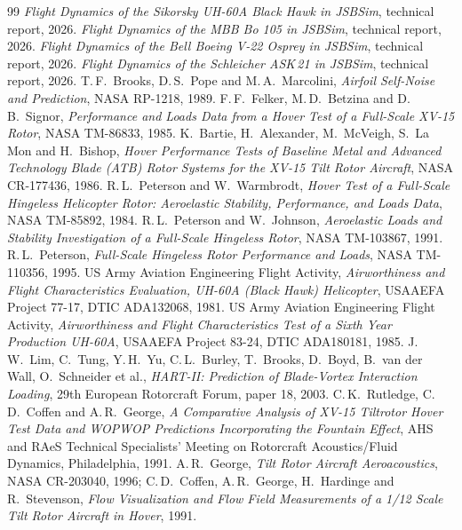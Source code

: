 \documentclass[10pt,a4paper,twocolumn]{article}
\begin{document}
\begin{thebibliography}{99}\small
{} \emph{Flight Dynamics of the Sikorsky UH-60A Black Hawk in JSBSim}, technical report, 2026.
 \emph{Flight Dynamics of the MBB Bo 105 in JSBSim}, technical report, 2026.
 \emph{Flight Dynamics of the Bell Boeing V-22 Osprey in JSBSim}, technical report, 2026.
 \emph{Flight Dynamics of the Schleicher ASK\,21 in JSBSim}, technical report, 2026.
 T.\,F.\ Brooks, D.\,S.\ Pope and M.\,A.\ Marcolini, \emph{Airfoil Self-Noise and Prediction}, NASA RP-1218, 1989.
 F.\,F.\ Felker, M.\,D.\ Betzina and D.\,B.\ Signor, \emph{Performance and Loads Data from a Hover Test of a Full-Scale XV-15 Rotor}, NASA TM-86833, 1985.
 K.\ Bartie, H.\ Alexander, M.\ McVeigh, S.\ La Mon and H.\ Bishop, \emph{Hover Performance Tests of Baseline Metal and Advanced Technology Blade (ATB) Rotor Systems for the XV-15 Tilt Rotor Aircraft}, NASA CR-177436, 1986.
 R.\,L.\ Peterson and W.\ Warmbrodt, \emph{Hover Test of a Full-Scale Hingeless Helicopter Rotor: Aeroelastic Stability, Performance, and Loads Data}, NASA TM-85892, 1984.
 R.\,L.\ Peterson and W.\ Johnson, \emph{Aeroelastic Loads and Stability Investigation of a Full-Scale Hingeless Rotor}, NASA TM-103867, 1991.
 R.\,L.\ Peterson, \emph{Full-Scale Hingeless Rotor Performance and Loads}, NASA TM-110356, 1995.
 US Army Aviation Engineering Flight Activity, \emph{Airworthiness and Flight Characteristics Evaluation, UH-60A (Black Hawk) Helicopter}, USAAEFA Project 77-17, DTIC ADA132068, 1981.
 US Army Aviation Engineering Flight Activity, \emph{Airworthiness and Flight Characteristics Test of a Sixth Year Production UH-60A}, USAAEFA Project 83-24, DTIC ADA180181, 1985.
 J.\,W.\ Lim, C.\ Tung, Y.\,H.\ Yu, C.\,L.\ Burley, T.\ Brooks, D.\ Boyd, B.\ van der Wall, O.\ Schneider et al., \emph{HART-II: Prediction of Blade-Vortex Interaction Loading}, 29th European Rotorcraft Forum, paper 18, 2003.
 C.\,K.\ Rutledge, C.\,D.\ Coffen and A.\,R.\ George, \emph{A Comparative Analysis of XV-15 Tiltrotor Hover Test Data and WOPWOP Predictions Incorporating the Fountain Effect}, AHS and RAeS Technical Specialists' Meeting on Rotorcraft Acoustics/Fluid Dynamics, Philadelphia, 1991.
 A.\,R.\ George, \emph{Tilt Rotor Aircraft Aeroacoustics}, NASA CR-203040, 1996; C.\,D.\ Coffen, A.\,R.\ George, H.\ Hardinge and R.\ Stevenson, \emph{Flow Visualization and Flow Field Measurements of a 1/12 Scale Tilt Rotor Aircraft in Hover}, 1991.

\end{thebibliography}
\end{document}

